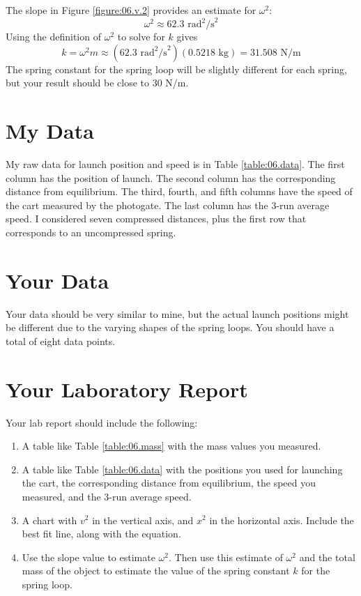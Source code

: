 The slope in Figure \ref{figure:06.v.2} provides an estimate for $\omega^{2}$:
\begin{equation}
    \omega^{2} \approx 62.3 \text{ rad}^{2}\text{/s}^{2}
\end{equation}
Using the definition of $\omega^{2}$ to solve for $k$ gives
\begin{equation}
    k = \omega^{2} m \approx \left( 62.3 \text{ rad}^{2}\text{/s}^{2} \right) \left( 0.5218 \text{ kg} \right) = 31.508 \text{ N/m}
\end{equation}
The spring constant for the spring loop will be slightly different for each spring, but your result should be close to 30 N/m.
%
\section{My Data}
%
My raw data for launch position and speed is in Table \ref{table:06.data}. The first column has the position of launch. The second column has the corresponding distance from equilibrium. The third, fourth, and fifth columns have the speed of the cart measured by the photogate. The last column has the 3-run average speed. I considered seven compressed distances, plus the first row that corresponds to an uncompressed spring.
%
\section{Your Data}
%
Your data should be very similar to mine, but the actual launch positions might be different due to the varying shapes of the spring loops. You should have a total of eight data points.
%
\newpage
\section{Your Laboratory Report}
%
Your lab report should include the following:
\begin{enumerate}
    \item A table like Table \ref{table:06.mass} with the mass values you measured.
    \item A table like Table \ref{table:06.data} with the positions you used for launching the cart, the corresponding distance from equilibrium, the speed you measured, and the 3-run average speed.
    \item A chart with $v^{2}$ in the vertical axis, and $x^{2}$ in the horizontal axis. Include the best fit line, along with the equation.
    \item Use the slope value to estimate $\omega^{2}$. Then use this estimate of $\omega^{2}$ and the total mass of the object to estimate the value of the spring constant $k$ for the spring loop.
\end{enumerate}
%
\newpage
